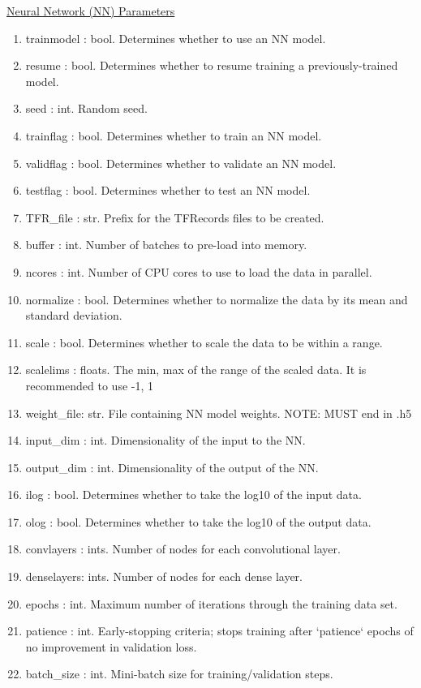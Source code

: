 \documentclass[letterpaper, 12pt]{article}
\begin{document}
\noindent \underline{Neural Network (NN) Parameters}
\begin{enumerate}
\item trainmodel : bool. Determines whether to use an NN model.
\item resume     : bool. Determines whether to resume training a previously-trained 
                   model.
\item seed       : int.  Random seed.
\item trainflag  : bool. Determines whether to train    an NN model.
\item validflag  : bool. Determines whether to validate an NN model.
\item testflag   : bool. Determines whether to test     an NN model.

\item TFR_file   : str.  Prefix for the TFRecords files to be created.
\item buffer     : int.  Number of batches to pre-load into memory.
\item ncores     : int.  Number of CPU cores to use to load the data in parallel.

\item normalize  : bool. Determines whether to normalize the data by its mean and 
                   standard deviation.
\item scale      : bool. Determines whether to scale the data to be within a range.
\item scalelims  : floats. The min, max of the range of the scaled data.
                     It is recommended to use -1, 1

\item weight_file: str.  File containing NN model weights.
                   NOTE: MUST end in .h5
\item input_dim  : int.  Dimensionality of the input  to the NN.
\item output_dim : int.  Dimensionality of the output of the NN.
\item ilog       : bool. Determines whether to take the log10 of the input  data.
\item olog       : bool. Determines whether to take the log10 of the output data.

\item convlayers : ints. Number of nodes for each convolutional layer.
\item denselayers: ints. Number of nodes for each dense         layer.
\item epochs     : int.  Maximum number of iterations through the training data set.
\item patience   : int.  Early-stopping criteria; stops training after `patience` 
                   epochs of no improvement in validation loss.
\item batch_size : int.  Mini-batch size for training/validation steps.


\end{enumerate}
\end{document}

